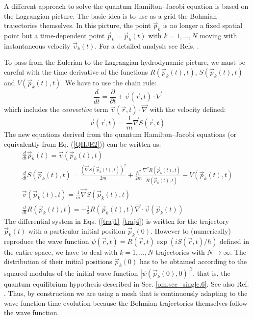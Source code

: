 \documentclass[nofootinbib, secnumarabic, amsmath, nobibnotes,11pt,aps,pra, floatfix]{revtex4-1}
\newcommand{\sref}[1]{Sec. \ref{#1}}
\newcommand{\eref}[1]{Eq. (\ref{#1})}
\begin{document}
A different approach to solve the quantum Hamilton--Jacobi equation
is based on the Lagrangian picture. The basic idea is to use as a
grid the Bohmian trajectories themselves. In this picture, the point
$\vec{p}_k$ is no longer a fixed spatial point but a time-dependent
point $\vec{p}_k = \vec{p}_k(t)$ with $k = 1,\ldots,N$ moving with
instantaneous velocity $\vec{v}_k(t)$. For a detailed analysis see
Refs. \cite{om.Wyatt1, om.Wyatt2, om.Wyatt3, om.Frederick}.

To pass from the Eulerian to the Lagrangian hydrodynamic picture, we
must  be careful with the time derivative of the functions
$R(\vec{p}_{k}(t),t)$, $S(\vec{p}_{k}(t),t)$ and
$V(\vec{p}_{k}(t),t)$. We have to use the chain rule:
\begin{equation}
\frac{d}{dt} = \frac{\partial}{\partial t} + \vec v(\vec r,t)\cdot\vec{\nabla}
\end{equation}
which includes the \textit{convective} term \textit{$\vec{v}(\vec r,t)\cdot\vec{\nabla}$} with the velocity defined:
\begin{equation}
\vec{v}(\vec r,t) = \frac{1}{m}\vec{\nabla} S(\vec r,t)
\end{equation}
The new equations derived from the quantum Hamilton--Jacobi equations (or equivalently from \eref{QHJE2}) can be written as:
\begin{gather}
\frac{d}{dt}\vec{p}_k(t) = \vec{v}(\vec{p}_k(t),t)\label{traj1}\\[0.1in]
\frac{d}{dt}S(\vec{p}_k(t),t) = \frac{(\vec{\nabla} S(\vec{p}_k(t),t))^{2}}{2m} + \frac{\hbar^{2}%
}{2m}\frac{\nabla^{2}R(\vec{p}_k(t),t)}{R(\vec{p}_k(t),t)} - V(\vec{p}_k(t),t)\label{traj2}\\[0.1in]
\vec{v}(\vec{p}_k(t),t) = \frac{1}{m}\vec{\nabla} S(\vec{p}_k(t),t)\label{traj3}\\[0.1in]
\frac{d}{dt}R(\vec{p}_k(t),t) = -\frac{1}{2}R(\vec{p}_k(t),t)\vec{\nabla}\cdot\vec{v}(\vec
{p}_k(t))\label{traj4}%
\end{gather}
The differential system in Eqs. (\ref{traj1}--\ref{traj4}) is written for the trajectory $\vec{p}_k(t)$ with a particular initial position $\vec{p}_k(0)$. However to (numerically) reproduce the wave function $\psi(\vec r,t) = R(\vec r,t)\exp(iS(\vec r,t)/\hbar)$ defined in the entire space, we have to deal with $k = 1,\ldots,N$ trajectories with $N\rightarrow\infty$. The distribution of their initial positions $\vec{p}_k(0)$ has to be obtained according to the squared modulus of the initial wave function $|\psi(\vec p_k(0),0)|^2$, that is, the quantum equilibrium hypothesis described in \sref{om.sec_single.6}. See also Ref. \cite{om.Holand1993}. Thus, by construction we are using a mesh that is continuously adapting to the wave function time evolution because the Bohmian trajectories themselves follow the wave function.
\end{document}
